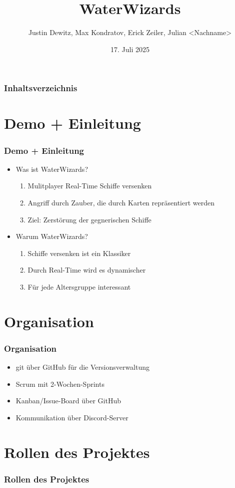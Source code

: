 \documentclass{beamer}
\title{WaterWizards}
\author{Justin Dewitz, Max Kondratov, Erick Zeiler, Julian <Nachname>}
\date{17. Juli 2025}
\begin{document}
\frame{\titlepage}

\begin{frame}
\frametitle{Inhaltsverzeichnis}
\tableofcontents
\end{frame}

\section{Demo + Einleitung}
\begin{frame}
\frametitle{Demo + Einleitung}
\begin{itemize}
  \item Was ist WaterWizards?
  \begin{enumerate}
    \item Mulitplayer Real-Time Schiffe versenken
    \item Angriff durch Zauber, die durch Karten repräsentiert werden
    \item Ziel: Zerstörung der gegnerischen Schiffe
  \end{enumerate}
  \item Warum WaterWizards?
  \begin{enumerate}
    \item Schiffe versenken ist ein Klassiker
    \item Durch Real-Time wird es dynamischer
    \item Für jede Altersgruppe interessant
  \end{enumerate}
\end{itemize}
\end{frame}

\section{Organisation}
\begin{frame}
  \frametitle{Organisation}
  \begin{itemize}
    \item git über GitHub für die Versionsverwaltung 
    \item Scrum mit 2-Wochen-Sprints
    \item Kanban/Issue-Board über GitHub
    \item Kommunikation über Discord-Server
  \end{itemize}
\end{frame}

\section{Rollen des Projektes}
\begin{frame}
\frametitle{Rollen des Projektes}

\end{frame}
\end{document}
